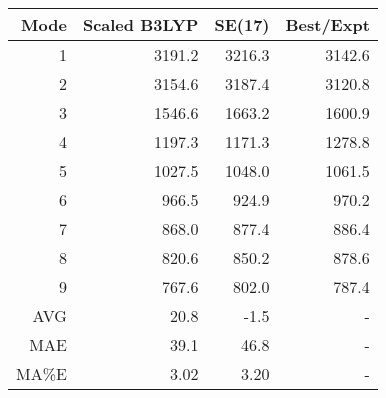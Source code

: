 \documentclass[11pt]{article}
\author{Brent Westbrook}
\date{\today}
\title{}
\begin{document}
\tableofcontents

\begin{center}
\begin{tabular}{rrrr}
Mode & Scaled B3LYP & SE(17) & Best/Expt\\
\hline
1 & 3191.2 & 3216.3 & 3142.6\\
2 & 3154.6 & 3187.4 & 3120.8\\
3 & 1546.6 & 1663.2 & 1600.9\\
4 & 1197.3 & 1171.3 & 1278.8\\
5 & 1027.5 & 1048.0 & 1061.5\\
6 & 966.5 & 924.9 & 970.2\\
7 & 868.0 & 877.4 & 886.4\\
8 & 820.6 & 850.2 & 878.6\\
9 & 767.6 & 802.0 & 787.4\\
\hline
AVG & 20.8 & -1.5 & -\\
MAE & 39.1 & 46.8 & -\\
MA\%E & 3.02 & 3.20 & -\\
\end{tabular}
\end{center}
\end{document}

